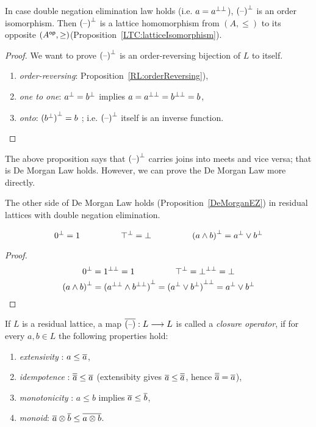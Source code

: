%
\begin{proposition}
In case double negation elimination law holds (i.e.  $a = {{a}^{\bot\bot}}$), 
${{{(\mbox{\textendash})}}^{\bot}}$ is an order isomorphism.
Then ${{{(\mbox{\textendash})}}^{\bot}}$ is a lattice homomorphism
from $(A,\leq)$ to its opposite $(A^{\sf op}, \geq)$(Proposition~\ref{LTC:latticeIsomorphism}).
\end{proposition}
\begin{proof}
We want to prove 
${{{(\mbox{\textendash})}}^{\bot}}$ is an order-reversing 
bijection of $L$ to itself. 
\begin{enumerate}
\item {\em order-reversing}: Proposition~\ref{RL:orderReversing}),
\item {\em one to one}: ${{a}^{\bot}} = {{b}^{\bot}}$ implies $a = {{a}^{\bot\bot}} = {{b}^{\bot\bot}} = b$,
\item {\em onto}: ${{({{b}^{\bot}})}^{\bot}} = b$ ; 
i.e. ${{{(\mbox{\textendash})}}^{\bot}}$  itself is an inverse function. 
\end{enumerate}
\end{proof}
%
The above proposition says 
that ${{{(\mbox{\textendash})}}^{\bot}}$ carries joins into meets and vice versa; 
that is De Morgan Law holds. However, we can prove the De Morgan Law more directly.
%
\begin{proposition} 
The other side of De Morgan Law holds (Proposition~\ref{DeMorganEZ}) 
in residual lattices with double negation elimination.

\[
	{{\mbox{\boldmath{0}}}^{\bot}} = \mbox{\boldmath{1}}
\hskip  48pt 
	{{\top}^{\bot}} = \bot
\hskip 48pt
  {{(a \wedge b)}^{\bot}} =  {{a}^{\bot}} \vee {{b}^{\bot}} \]
\end{proposition}

\begin{proof} 
\[ {{\mbox{\boldmath{0}}}^{\bot}} = {{\mbox{\boldmath{1}}}^{\bot\bot}} = \mbox{\boldmath{1}} 
\hskip 48pt
 {{\top}^{\bot}} = {{\bot}^{\bot\bot}} = \bot \]
\[ {{(a \wedge b)}^{\bot}} = {{({{a}^{\bot\bot}} \wedge {{b}^{\bot\bot}})}^{\bot}}
= {{({{a}^{\bot}} \vee {{b}^{\bot}})}^{\bot\bot}} = {{a}^{\bot}} \vee {{b}^{\bot}}
\]
\end{proof}
%
%
\begin{definition} 
\label{RL:closureDef}
If $L$ is a residual lattice, 
a map $\overline{{(\mbox{\textendash})}} : L \longrightarrow L$
is called a {\em closure operator},
if for every $a,b\in L$ the following properties hold:
\begin{enumerate}
\item {\em extensivity} :  $a \leq \overline{a}$,
\item {\em idempotence} : $ \overline{\overline{a}} \leq \overline{a}$ 
\hskip 48pt
(extensibity gives $\overline{a} \leq \overline{\overline{a}}$, hence $\overline{\overline{a}} = \overline{a}$),
\item {\em monotonicity} : $a \leq b$ implies $\overline{a} \leq \overline{b}$,
\item {\em monoid}:
$ \overline{a}  \otimes \overline{b} \leq \overline{a \otimes b}$.
\end{enumerate}
\end{definition}


